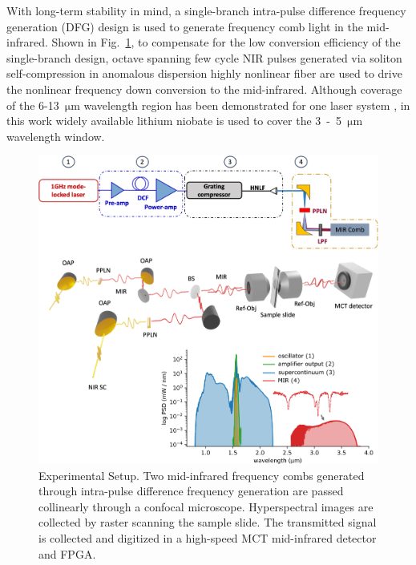 \documentclass{optica-article}
\begin{document}
With long-term stability in mind, a single-branch intra-pulse difference frequency generation (DFG) design is used to generate frequency comb light in the mid-infrared. 
% 
%
Shown in \mbox{Fig. \ref{fig:setup}}, to compensate for the low conversion efficiency of the single-branch design, octave spanning few cycle NIR pulses generated via soliton self-compression in anomalous dispersion highly nonlinear fiber are used to drive the nonlinear frequency down conversion to the mid-infrared. Although coverage of the \mbox{6-13 $\mathrm{\mu m}$} wavelength region has been demonstrated for one laser system \cite{hoghooghiBroadband1GHzMidinfrared2022}, in this work widely available lithium niobate is used to cover the \mbox{3 - 5 $\mathrm{\mu m}$} wavelength window.

\begin{figure}[h]
    \centering
    \includegraphics[width=\linewidth]{setup_3D_v3.png}
    \caption{Experimental Setup. Two mid-infrared frequency combs generated through intra-pulse difference frequency generation are passed collinearly through a confocal microscope. Hyperspectral images are collected by raster scanning the sample slide. The transmitted signal is collected and digitized in a high-speed MCT mid-infrared detector and FPGA.}
    \label{fig:setup}
\end{figure}
\end{document}

